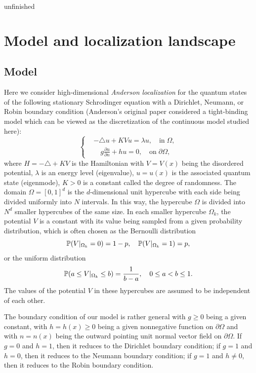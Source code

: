 \documentclass[a4paper,11pt]{article}
\begin{document}
{\color{red} unfinished}

\section{Model and localization landscape}\label{model}

\subsection{Model}

Here we consider high-dimensional \emph{Anderson localization} for the quantum states of the following stationary Schrodinger equation with a Dirichlet, Neumann, or Robin boundary condition (Anderson's original paper \cite{chen2004markov} considered a tight-binding model which can be viewed as the discretization of the continuous model studied here):
\begin{equation}\label{anderson}
\left\{
\begin{split}
& -\triangle u + K V u = \lambda u, \quad \textrm{in} \; \Omega, \\
& \quad g \frac{\partial u}{\partial n} + h u = 0, \quad \textrm{on} \; \partial  \Omega,
\end{split}
\right.
\end{equation}
where $H = -\triangle + K V$ is the Hamiltonian with $V = V(x)$ being the disordered potential, $\lambda$ is an energy level (eigenvalue), $u = u(x)$ is the associated quantum state (eigenmode), $K > 0$ is a constant called the degree of randomness. The domain $\Omega = [0,1]^d$ is the $d$-dimensional unit hypercube with each side being divided uniformly into $N$ intervals. In this way, the hypercube $\Omega$ is divided into $N^d$ smaller hypercubes of the same size. In each smaller hypercube $\Omega_k$, the potential $V$ is a constant with its value being sampled from a given probability distribution, which is often chosen as the Bernoulli distribution
\begin{equation}\label{bernoulli}
\mathbb{P}(V|_{\Omega_k} = 0) = 1-p, \quad \mathbb{P}(V|_{\Omega_k} = 1) = p,
\end{equation}
or the uniform distribution
\begin{equation}\label{uniform}
\mathbb{P}(a \leq V|_{\Omega_k} \leq b) = \frac{1}{b-a}, \quad 0 \leq a < b \leq 1.
\end{equation}
The values of the potential $V$ in these hypercubes are assumed to be independent of each other.

The boundary condition of our model is rather general with $g \geq 0$ being a given constant, with $h = h(x) \geq 0$ being a given nonnegative function on $\partial \Omega$ and with $n = n(x)$ being the outward pointing unit normal vector field on $\partial \Omega$. If $g = 0$ and $h = 1$, then it reduces to the Dirichlet boundary condition; if $g = 1$ and $h = 0$, then it reduces to the Neumann boundary condition; if $g = 1$ and $h \neq 0$, then it reduces to the Robin boundary condition.
\end{document}
